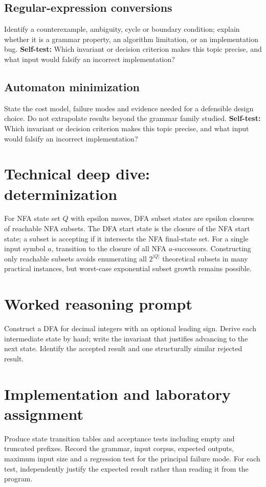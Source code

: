 \documentclass[11pt,letterpaper]{article}
\begin{document}
\subsection{Regular-expression conversions}
Identify a counterexample, ambiguity, cycle or boundary condition; explain whether it is a grammar property, an algorithm limitation, or an implementation bug.
\textbf{Self-test:} Which invariant or decision criterion makes this topic precise, and what input would falsify an incorrect implementation?
\subsection{Automaton minimization}
State the cost model, failure modes and evidence needed for a defensible design choice. Do not extrapolate results beyond the grammar family studied.
\textbf{Self-test:} Which invariant or decision criterion makes this topic precise, and what input would falsify an incorrect implementation?
\section{Technical deep dive: determinization}
For NFA state set $Q$ with epsilon moves, DFA subset states are epsilon closures of reachable NFA subsets. The DFA start state is the closure of the NFA start state; a subset is accepting if it intersects the NFA final-state set. For a single input symbol $a$, transition to the closure of all NFA $a$-successors. Constructing only reachable subsets avoids enumerating all $2^{|Q|}$ theoretical subsets in many practical instances, but worst-case exponential subset growth remains possible.
\section{Worked reasoning prompt}
Construct a DFA for decimal integers with an optional leading sign. Derive each intermediate state by hand; write the invariant that justifies advancing to the next state. Identify the accepted result and one structurally similar rejected result.
\section{Implementation and laboratory assignment}
Produce state transition tables and acceptance tests including empty and truncated prefixes. Record the grammar, input corpus, expected outputs, maximum input size and a regression test for the principal failure mode. For each test, independently justify the expected result rather than reading it from the program.
\end{document}
